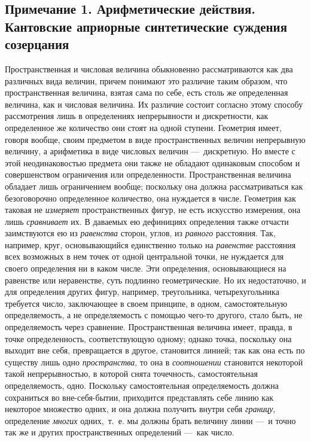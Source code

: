 {\subsection*{Примечание 1. Арифметические действия. Кантовские априорные
синтетические суждения созерцания}

Пространственная и числовая величина обыкновенно рассматриваются как два
различных вида величин, причем понимают это различие таким образом, что
пространственная величина, взятая сама по себе, есть столь же определенная
величина, как и числовая величина. Их различие состоит согласно этому
способу рассмотрения лишь в определениях непрерывности и дискретности, как
определенное же количество они стоят на одной ступени. Геометрия имеет,
говоря вообще, своим предметом в виде пространственных величин непрерывную
величину, а арифметика в виде числовых величин —~дискретную. Но вместе с
этой неодинаковостью предмета они также не обладают одинаковым способом и
совершенством ограничения или определенности. Пространственная величина
обладает лишь ограничением вообще; поскольку она должна рассматриваться как
безоговорочно определенное количество, она нуждается в числе. Геометрия как
таковая не {\em измеряет} пространственных фигур, не
есть искусство измерения, она лишь {\em сравнивает} их.
В даваемых ею дефинициях определения также отчасти заимствуются ею из
{\em равенства} сторон, углов, из
{\em равного} расстояния. Так, например, круг,
основывающийся единственно только на {\em равенстве}
расстояния всех возможных в нем точек от одной центральной точки, не
нуждается для своего определения ни в каком числе. Эти определения,
основывающиеся на равенстве или неравенстве, суть подлинно геометрические.
Но их недостаточно, и для определения других фигур, например, треугольника,
четырехугольника требуется число, заключающее в своем принципе, в одном,
самостоятельную определяемость, а не определяемость с помощью чего-то
другого, стало быть, не определяемость через сравнение. Пространственная
величина имеет, правда, в точке определенность, соответствующую одному;
однако точка, поскольку она выходит вне себя, превращается в другое,
становится линией; так как она есть по существу лишь одно
{\em пространства}, то она в
{\em соотношении} становится некоторой такой
непрерывностью, в которой снята точечность, самостоятельная определяемость,
одно. Поскольку самостоятельная определяемость должна сохраниться во
вне-себя-бытии, приходится представлять себе линию как некоторое множество
одних, и она должна получить внутри себя {\em границу},
определение {\em многих} одних,~т.~е. мы должны брать
величину линии —~и точно так же и других пространственных определений —~как
число.

}
